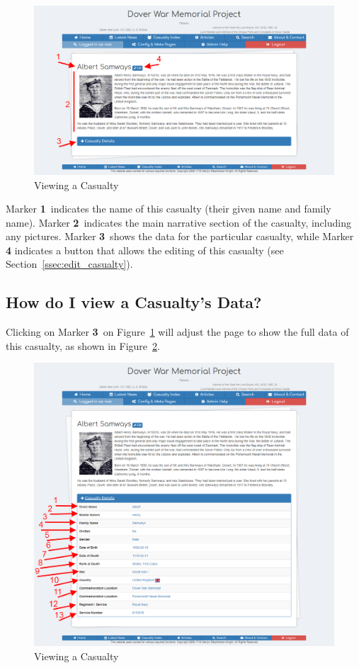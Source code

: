 \documentclass[12pt]{article}
\newcommand{\marker}[1]{Marker \color{red}\textbf{#1}\color{black}}
\begin{document}
\begin{figure}[h]
  \centering
 \includegraphics[width=.9\textwidth]{pics/view_casualty.png}
	\caption{Viewing a Casualty}\label{fig:view_casualty}
\end{figure}

\marker{1}\ indicates the name of this casualty (their given name and family name). \marker{2}\ indicates the main narrative section of the casualty, including any pictures. \marker{3}\ shows the data for the particular casualty, while \marker{4} indicates a button that allows the editing of this casualty (see Section~\ref{ssec:edit_casualty}).

\newpage
\FloatBarrier
\subsection{How do I view a Casualty's Data?}\label{ssec:view_casualty_data}
Clicking on \marker{3}\ on Figure~\ref{fig:view_casualty} will adjust the page to show the full data of this casualty, as shown in Figure~\ref{fig:view_casualty_data}.

\begin{figure}[h]
  \centering
 \includegraphics[width=.9\textwidth]{pics/view_casualty_data.png}
	\caption{Viewing a Casualty}\label{fig:view_casualty_data}
\end{figure}
\end{document}
